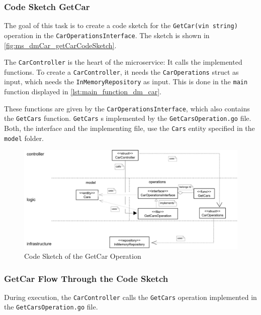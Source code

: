 \subsubsection*{Code Sketch GetCar}
The goal of this task is to create a code sketch for the \texttt{GetCar(vin string)} operation in the \texttt{CarOperationsInterface}.
The sketch is shown in \autoref{fig:ms_dmCar_getCarCodeSketch}.

The \texttt{CarController} is the heart of the microservice:
It calls the implemented functions.
To create a \texttt{CarController}, it needs the \texttt{CarOperations} struct as input, which needs the \texttt{InMemoryRepository} as input.
This is done in the \texttt{main} function displayed in \autoref{lst:main_function_dm_car}.

These functions are given by the \texttt{CarOperationsInterface}, which also contains the \texttt{GetCars} function.
\texttt{GetCars} s implemented by the \texttt{GetCarsOperation.go} file.
Both, the interface and the implementing file, use the \texttt{Cars} entity specified in the \texttt{model} folder.

\begin{figure}
    \centering
    \includegraphics[width=\textwidth]{figures/microservices/dmCar/ms_dmCar_codeSketchGetCar.png}
    \caption{Code Sketch of the GetCar Operation}
    \label{fig:ms_dmCar_getCarCodeSketch}
\end{figure}
\subsubsection*{GetCar Flow Through the Code Sketch}
During execution, the \texttt{CarController} calls the \texttt{GetCars} operation implemented in the \texttt{GetCarsOperation.go} file.

